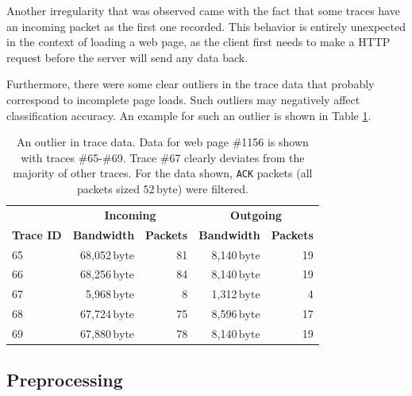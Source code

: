 \documentclass[
	ruledheaders=chapter,
	class=report,
	thesis={type=master, department=inf},
	accentcolor=1c,
	custommargins=true,
	marginpar=false,
	parskip=half-,
	fontsize=11pt,
]{tudapub}
\begin{document}
	Another irregularity that was observed came with the fact that some traces have an incoming packet as the first one recorded. This behavior is entirely unexpected in the context of loading a web page, as the client first needs to make a HTTP request before the server will send any data back.
	
	Furthermore, there were some clear outliers in the trace data that probably correspond to incomplete page loads. Such outliers may negatively affect classification accuracy. An example for such an outlier is shown in Table \ref{tbl:outlier}.
	
	\begin{table}
		\centering
		\begin{tabular}{lrrrr}
			\toprule & \multicolumn{2}{c}{\textbf{Incoming}} & \multicolumn{2}{c}{\textbf{Outgoing}} \\
			\textbf{Trace ID} & \textbf{Bandwidth} & \textbf{Packets} & \textbf{Bandwidth} & \textbf{Packets} \\
			\midrule 65 & 68,052$\,\text{byte}$ & 81 & 8,140$\,\text{byte}$ & 19 \\
			66 & 68,256$\,\text{byte}$ & 84 & 8,140$\,\text{byte}$ & 19 \\
			67 & 5,968$\,\text{byte}$ & 8 & 1,312$\,\text{byte}$ & 4 \\
			68 & 67,724$\,\text{byte}$ & 75 & 8,596$\,\text{byte}$ & 17 \\
			69 & 67,880$\,\text{byte}$ & 78 & 8,140$\,\text{byte}$ & 19 \\
			\bottomrule
		\end{tabular}
		\caption[An outlier in trace data]{An outlier in trace data. Data for web page \#1156 is shown with traces \#65-\#69. Trace \#67 clearly deviates from the majority of other traces. For the data shown, \texttt{ACK} packets (all packets sized $52\,\text{byte}$) were filtered.}
		\label{tbl:outlier}
	\end{table}

	\subsection{Preprocessing}
	\label{methods:dataset:pre}
	
\end{document}
